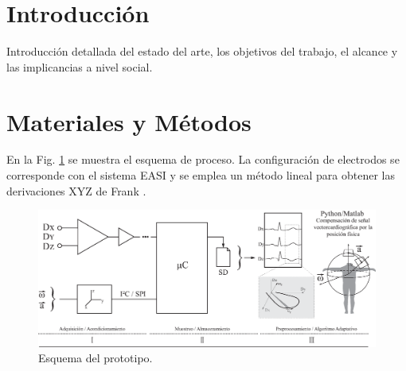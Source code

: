 \documentclass[]{article}
\begin{document}
\begin{multicols}{2}
\section{Introducción}
Introducción detallada del estado del arte, los objetivos del trabajo, el alcance y las implicancias a nivel social.

\lipsum[1] %



\section{Materiales y Métodos}
En la Fig. \ref{Fig_Esquema} se muestra el esquema de proceso. La configuración de electrodos se corresponde con el sistema EASI y se emplea un método lineal para obtener las derivaciones XYZ de Frank \cite{Feild2002}.

\end{multicols}
\begin{figure}[ht]
	\centering
	\includegraphics[width=\textwidth]{img/Esquema.eps} 
	\caption{Esquema del prototipo.}
	\label{Fig_Esquema}
\end{figure}
\begin{multicols}{2}

\lipsum[2-3] %

\end{multicols}
\end{document}
